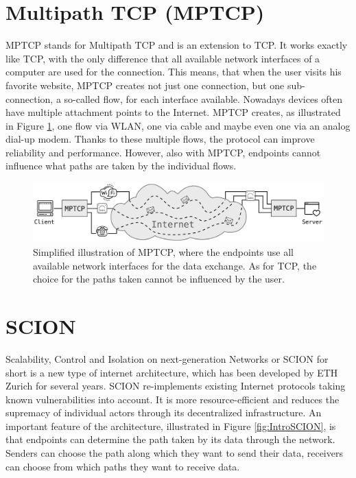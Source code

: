\section{Multipath TCP (MPTCP)}

MPTCP stands for Multipath TCP and is an extension to TCP. It works exactly like TCP, with the only difference that all available network interfaces of a computer are used for the connection. This means, that when the user visits his favorite website, MPTCP creates not just one connection, but one sub-connection, a so-called flow, for each interface available. Nowadays devices often have multiple attachment points to the Internet. MPTCP creates, as illustrated in Figure \ref{fig:IntroMPTCP}, one flow via WLAN, one via cable and maybe even one via an analog dial-up modem. Thanks to these multiple flows, the protocol can improve reliability and performance. However, also with MPTCP, endpoints cannot influence what paths are taken by the individual flows. 

\begin{figure}[H]
	\begin{center}
		\def\svgwidth{1\textwidth}
		\includegraphics[scale=0.28]{../illustrations/introduction/MPTCPConnection.pdf}    
		\caption[]{Simplified illustration of MPTCP, where the endpoints use all available network interfaces for the data exchange. As for TCP, the choice for the paths taken cannot be influenced by the user.}
		\label{fig:IntroMPTCP}
	\end{center}
\end{figure}

\section{SCION}

Scalability, Control and Isolation on next-generation Networks or SCION for short is a new type of internet architecture, which has been developed by ETH Zurich for several years. SCION re-implements existing Internet protocols taking known vulnerabilities into account. It is more resource-efficient and reduces the supremacy of individual actors through its decentralized infrastructure. An important feature of the architecture, illustrated in Figure \ref{fig:IntroSCION}, is that endpoints can determine the path taken by its data through the network. Senders can choose the path along which they want to send their data, receivers can choose from which paths they want to receive data.

